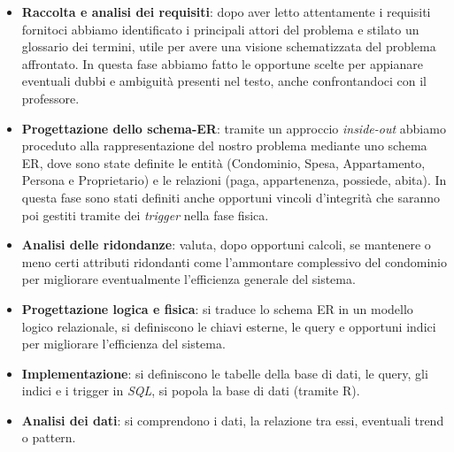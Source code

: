 \begin{itemize}
    \item \textbf{Raccolta e analisi dei requisiti}: dopo aver letto attentamente i requisiti fornitoci abbiamo identificato i principali attori del problema e stilato un glossario dei termini, utile per avere una visione schematizzata del problema affrontato. In questa fase abbiamo fatto le opportune scelte per appianare eventuali dubbi e ambiguità presenti nel testo, anche confrontandoci con il professore.
    \item \textbf{Progettazione dello schema-ER}: tramite un approccio \textit{inside-out} abbiamo proceduto alla rappresentazione del nostro problema mediante uno schema ER, dove sono state definite le entità (Condominio, Spesa, Appartamento, Persona e Proprietario) e le relazioni (paga, appartenenza, possiede, abita). In questa fase sono stati definiti anche opportuni vincoli d'integrità che saranno poi gestiti tramite dei \textit{trigger} nella fase fisica.
    \item \textbf{Analisi delle ridondanze}: valuta, dopo opportuni calcoli, se mantenere o meno certi attributi ridondanti come l'ammontare complessivo del condominio per migliorare eventualmente l'efficienza generale del sistema.
    \item \textbf{Progettazione logica e fisica}: si traduce lo schema ER in un modello logico relazionale, si definiscono le chiavi esterne, le query e opportuni indici per migliorare l'efficienza del sistema.
    \item \textbf{Implementazione}: si definiscono le tabelle della base di dati, le query, gli indici e i trigger in \textit{SQL}, si popola la base di dati (tramite R).
    \item \textbf{Analisi dei dati}: si comprendono i dati, la relazione tra essi, eventuali trend o pattern.
\end{itemize}
